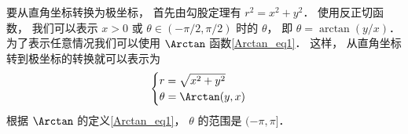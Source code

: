 要从直角坐标转换为极坐标， 首先由勾股定理有 $r^2 = x^2 + y^2$． 使用反正切函数， 我们可以表示 $x >0$ 或 $\theta\in(-\pi/2,\pi/2)$ 时的 $\theta$， 即 $\theta = \arctan(y/x)$． 为了表示任意情况我们可以使用 $\Arctan$ 函数\autoref{Arctan_eq1}． 这样， 从直角坐标转到极坐标的转换就可以表示为
\begin{equation}\label{Polar_eq4}
\begin{cases}
r = \sqrt{x^2 + y^2}\\
\theta = \Arctan(y, x)
\end{cases}
\end{equation}
根据 $\Arctan$ 的定义\autoref{Arctan_eq1}， $\theta$ 的范围是 $(-\pi, \pi]$．

